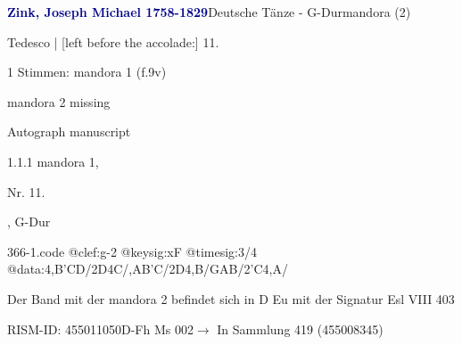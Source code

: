 \documentclass[twocolumn, 12pt]{book}
\begin{document}
\par \vspace{16pt} \textcolor{darkblue}{\textbf{Zink, Joseph Michael  1758-1829}}\hfillplus{\textbf{[366]}}\newline Deutsche Tänze - G-Dur\newline mandora (2)
\par \begin{itshape}[f.9v, at left:] Tedesco | [left before the accolade:] 11.\end{itshape} 
\par \textcolor{darkblue}{}  1 Stimmen: mandora 1  (f.9v)\newline \begin{small} mandora 2 missing\end{small} \newline Autograph manuscript
\par 1.1.1  mandora 1, \begin{itshape}Nr. 11.\end{itshape}, G-Dur  
\begin{filecontents*}{366-1.code}
@clef:g-2
@keysig:xF
@timesig:3/4
@data:4,B'CD/2D4C/,AB'C/2D4,B/GAB/2'C4,A/
\end{filecontents*}
\newline %
\par Der Band mit der mandora 2 befindet sich in D Eu mit der Signatur Esl VIII 403
\par RISM-ID: 455011050\newline D-Fh  Ms 002\newline $\rightarrow$ In Sammlung 419 (455008345)
      
\end{document}
